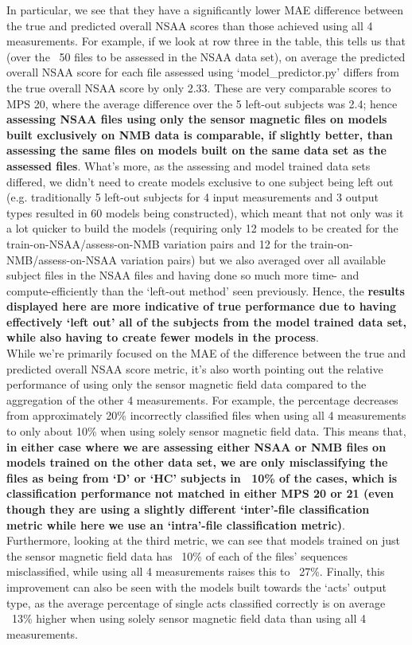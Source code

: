 \documentclass[12pt,twoside]{report}
\begin{document}
\quad In particular, we see that they have a significantly lower MAE difference between the true and predicted overall NSAA scores than those achieved using all 4 measurements. For example, if we look at row three in the table, this tells us that (over the ~50 files to be assessed in the NSAA data set), on average the predicted overall NSAA score for each file assessed using ‘model\_predictor.py’  differs from the true overall NSAA score by only 2.33. These are very comparable scores to MPS 20, where the average difference over the 5 left-out subjects was 2.4; hence \textbf{assessing NSAA files using only the sensor magnetic files on models built exclusively on NMB data is comparable, if slightly better, than assessing the same files on models built on the same data set as the assessed files}. What’s more, as the assessing and model trained data sets differed, we didn’t need to create models exclusive to one subject being left out (e.g. traditionally 5 left-out subjects for 4 input measurements and 3 output types resulted in 60 models being constructed), which meant that not only was it a lot quicker to build the models (requiring only 12 models to be created for the train-on-NSAA/assess-on-NMB variation pairs and 12 for the train-on-NMB/assess-on-NSAA variation pairs) but we also averaged over all available subject files in the NSAA files and having done so much more time- and compute-efficiently than the ‘left-out method’ seen previously. Hence, the \textbf{results displayed here are more indicative of true performance due to having effectively ‘left out’ all of the subjects from the model trained data set, while also having to create fewer models in the process}.\\

\quad While we’re primarily focused on the MAE of the difference between the true and predicted overall NSAA score metric, it’s also worth pointing out the relative performance of using only the sensor magnetic field data compared to the aggregation of the other 4 measurements. For example, the percentage decreases from approximately 20\% incorrectly classified files when using all 4 measurements to only about 10\% when using solely sensor magnetic field data. This means that, \textbf{in either case where we are assessing either NSAA or NMB files on models trained on the other data set, we are only misclassifying the files as being from ‘D’ or ‘HC’ subjects in ~10\% of the cases, which is classification performance not matched in either MPS 20 or 21 (even though they are using a slightly different ‘inter’-file classification metric while here we use an ‘intra’-file classification metric)}. Furthermore, looking at the third metric, we can see that models trained on just the sensor magnetic field data has ~10\% of each of the files’ sequences misclassified, while using all 4 measurements raises this to ~27\%. Finally, this improvement can also be seen with the models built towards the ‘acts’ output type, as the average percentage of single acts classified correctly is on average ~13\% higher when using solely sensor magnetic field data than using all 4 measurements.\\
\end{document}
